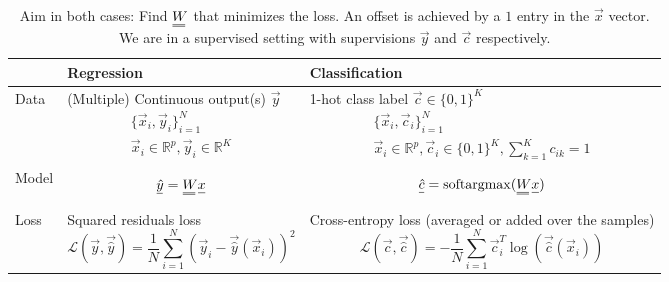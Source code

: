 \begin{table}[!htb]
    \centering
    \begin{tabular}{|p{}|p{}|p{}|}
        \hline
        & \textcolor{blue1}{Regression} & \textcolor{blue1}{Classification} \\
        \hline
        Data & (Multiple) Continuous output(s) $\vec{y}$
        \begin{equation*}
            \begin{gathered}
                \{ \vec{x}_i, \vec{y}_i \}_{i=1}^{N} \\
                \vec{x}_i \in \mathbb{R}^p, \vec{y}_i \in \mathbb{R}^K
            \end{gathered}
        \end{equation*} & 1-hot class label $\vec{c} \in \{0,1\}^K$
        \begin{equation*}
            \begin{gathered}
                \{ \vec{x}_i, \vec{c}_i \}_{i=1}^{N} \\
                \vec{x}_i \in \mathbb{R}^p, \vec{c}_i \in \{0,1\}^K, \sum_{k=1}^{K} c_{ik} = 1
            \end{gathered}
        \end{equation*} \\
        \hline
        Model & \begin{equation*}
            \vec{\hat{y}} = \mat{W} \vec{x}
        \end{equation*} &
        \begin{equation*}
            \vec{\hat{c}} = \operatorname{softargmax}(\mat{W} \vec{x})
        \end{equation*} \\
        \hline
        Loss & Squared residuals loss \begin{equation*}
            \mathcal{L}(\vec{y}, \vec{\hat{y}}) = \frac{1}{N} \sum_{i=1}^{N} \left( \vec{y}_i - \vec{\hat{y}}(\vec{x}_i) \right)^2
        \end{equation*} &
        Cross-entropy loss (averaged or added over the samples) \begin{equation*}
            \mathcal{L}(\vec{c}, \vec{\hat{c}}) = - \frac{1}{N} \sum_{i=1}^{N} \vec{c}_i^T \log(\vec{\hat{c}}(\vec{x}_i))
        \end{equation*} \\
        \hline
    \end{tabular}
    \caption{Aim in both cases: Find $\mat{W}$ that minimizes the loss. An offset is achieved by a $1$ entry in the $\vec{x}$ vector.
    We are in a supervised setting with supervisions $\vec{y}$ and $\vec{c}$ respectively.}
    \label{tab:classification_vs_regression}
\end{table}

